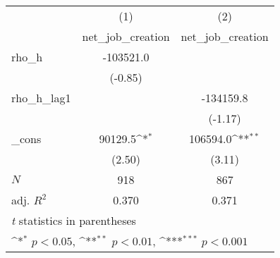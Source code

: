 {
\def\sym#1{\ifmmode^{#1}\else\(^{#1}\)\fi}
\begin{tabular}{l*{2}{c}}
\toprule
            &\multicolumn{1}{c}{(1)}&\multicolumn{1}{c}{(2)}\\
            &\multicolumn{1}{c}{net\_job\_creation}&\multicolumn{1}{c}{net\_job\_creation}\\
\midrule
rho\_h       &   -103521.0         &                     \\
            &     (-0.85)         &                     \\
\addlinespace
rho\_h\_lag1  &                     &   -134159.8         \\
            &                     &     (-1.17)         \\
\addlinespace
\_cons      &     90129.5\sym{*}  &    106594.0\sym{**} \\
            &      (2.50)         &      (3.11)         \\
\midrule
\(N\)       &         918         &         867         \\
adj. \(R^{2}\)&       0.370         &       0.371         \\
\bottomrule
\multicolumn{3}{l}{\footnotesize \textit{t} statistics in parentheses}\\
\multicolumn{3}{l}{\footnotesize \sym{*} \(p<0.05\), \sym{**} \(p<0.01\), \sym{***} \(p<0.001\)}\\
\end{tabular}
}
